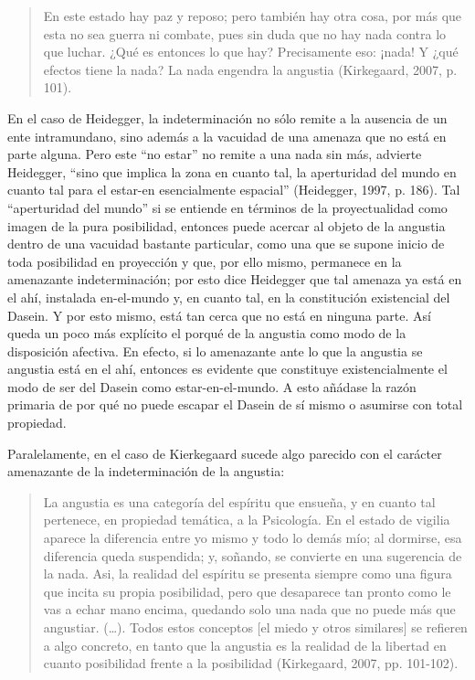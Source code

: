 \documentclass[]{article}
\begin{document}
\begin{quote}
En este estado hay paz y reposo; pero también hay otra cosa, por más que esta no sea guerra ni combate, pues sin duda que no hay nada contra lo que luchar. ¿Qué es entonces lo que hay? Precisamente eso: ¡nada! Y ¿qué efectos tiene la nada? La nada engendra la angustia (Kirkegaard, 2007, p. 101).
\end{quote}

En el caso de Heidegger, la indeterminación no sólo remite a la ausencia de un ente intramundano, sino además a la vacuidad de una amenaza que no está en parte alguna. Pero este ``no estar'' no remite a una nada sin más, advierte Heidegger, ``sino que implica la zona en cuanto tal, la aperturidad del mundo en cuanto tal para el estar-en esencialmente espacial'' (Heidegger, 1997, p. 186). Tal ``aperturidad del mundo'' si se entiende en términos de la proyectualidad como imagen de la pura posibilidad, entonces puede acercar al objeto de la angustia dentro de una vacuidad bastante particular, como una que se supone inicio de toda posibilidad en proyección y que, por ello mismo, permanece en la amenazante indeterminación; por esto dice Heidegger que tal amenaza ya está en el ahí, instalada en-el-mundo y, en cuanto tal, en la constitución existencial del Dasein. Y por esto mismo, está tan cerca que no está en ninguna parte. Así queda un poco más explícito el porqué de la angustia como modo de la disposición afectiva. En efecto, si lo amenazante ante lo que la angustia se angustia está en el ahí, entonces es evidente que constituye existencialmente el modo de ser del Dasein como estar-en-el-mundo. A esto añádase la razón primaria de por qué no puede escapar el Dasein de sí mismo o asumirse con total propiedad.

Paralelamente, en el caso de Kierkegaard sucede algo parecido con el carácter amenazante de la indeterminación de la angustia:

\begin{quote}
La angustia es una categoría del espíritu que ensueña, y en cuanto tal pertenece, en propiedad temática, a la Psicología. En el estado de vigilia aparece la diferencia entre yo mismo y todo lo demás mío; al dormirse, esa diferencia queda suspendida; y, soñando, se convierte en una sugerencia de la nada. Asi, la realidad del espíritu se presenta siempre como una figura que incita su propia posibilidad, pero que desaparece tan pronto como le vas a echar mano encima, quedando solo una nada que no puede más que angustiar. (\ldots{}). Todos estos conceptos {[}el miedo y otros similares{]} se refieren a algo concreto, en tanto que la angustia es la realidad de la libertad en cuanto posibilidad frente a la posibilidad (Kirkegaard, 2007, pp. 101-102).
\end{quote}
\end{document}
